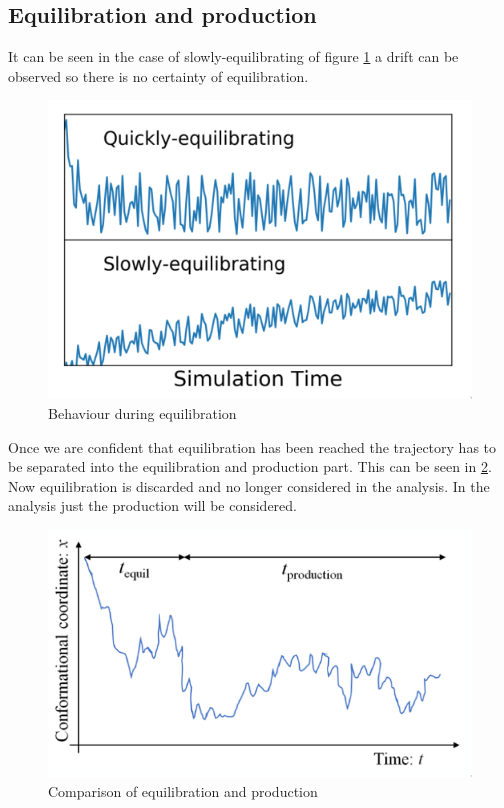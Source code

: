 	\subsection{Equilibration and production}
	It can be seen in the case of slowly-equilibrating of figure \ref{fig:equilibration} a drift can be observed so there is no certainty of equilibration.

	\begin{figure}[H]
		\includegraphics[width = \textwidth]{equilibration}
		\caption{Behaviour during equilibration}
		\label{fig:equilibration}
	\end{figure}

	Once we are confident that equilibration has been reached the trajectory has to be separated into the equilibration and production part.
	This can be seen in \ref{fig:equilibration-production}.
	Now equilibration is discarded and no longer considered in the analysis.
	In the analysis just the production will be considered.

	\begin{figure}[H]
		\includegraphics[width = \textwidth]{equilibration-production}
		\caption{Comparison of equilibration and production}
		\label{fig:equilibration-production}
	\end{figure}

